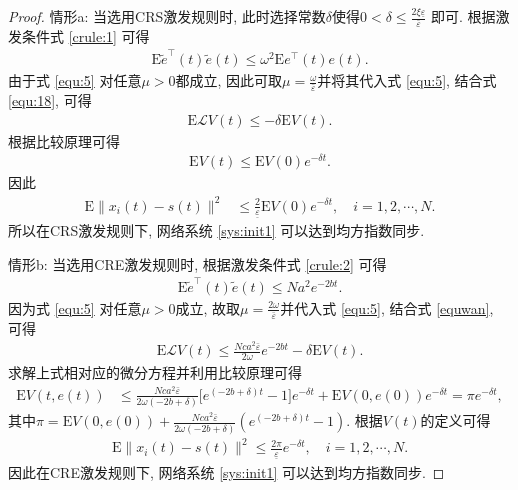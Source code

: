 \begin{proof}
            情形a: 当选用CRS激发规则时, 此时选择常数$\delta$使得$0<\delta\leq\frac{2\xi\underline{\varepsilon}}{\bar{\varepsilon}}$ 即可. 根据激发条件式 \eqref{crule:1} 可得
            \begin{align}\label{equ:18}
                \mathrm{E}\tilde{e}^{\top}(t)\tilde{e}(t)\leq\omega^2\mathrm{E}e^\top(t)e(t).
            \end{align}
            由于式 \eqref{equ:5} 对任意$\mu>0$都成立, 因此可取$\mu=\frac{\omega}{\bar{\varepsilon}}$并将其代入式 \eqref{equ:5}, 结合式 \eqref{equ:18}, 可得
            \begin{align*}
                \mathrm{E}\mathcal{L}V(t)\leq -\delta \mathrm{E}V(t).
            \end{align*}
            根据比较原理可得
            \begin{align*}
            \mathrm{E}V(t)\leq \mathrm{E}V(0)e^{-\delta t}.
            \end{align*}
            因此
            \begin{align*}
             \mathrm{E}\| x_{i}(t)-s(t)\|^2&\leq\frac{2}{\underline{\varepsilon}}\mathrm{E}V(0)e^{-\delta t},\quad i=1,2,\cdots,N.
            \end{align*}
            所以在CRS激发规则下, 网络系统 \eqref{sys:init1} 可以达到均方指数同步.

        情形b: 当选用CRE激发规则时, 根据激发条件式 \eqref{crule:2} 可得
            \begin{align}\label{equwan}
                \mathrm{E}\tilde{e}^{\top}(t)\tilde{e}(t)\leq Na^2e^{-2bt}.
            \end{align}
        因为式 \eqref{equ:5} 对任意$\mu>0$成立, 故取$\mu=\frac{2\omega}{\bar{\varepsilon}}$并代入式 \eqref{equ:5}, 结合式 \eqref{equwan}, 可得
            \begin{align*}
            \mathrm{E}\mathcal{L}V(t)
            \leq \frac{Nca^2\bar{\varepsilon}}{2\omega}e^{-2bt} -\delta \mathrm{E}V(t).
            \end{align*}
        求解上式相对应的微分方程并利用比较原理可得
            \begin{align*}
            \mathrm{E}V(t,e(t))&\leq\frac{Nca^2\bar{\varepsilon}}{2\omega(-2b+\delta)}\Big[e^{(-2b+\delta)t}-1\Big]e^{-\delta t}+ \mathrm{E}V(0,e(0))e^{-\delta t}
            =\pi e^{-\delta t},
            \end{align*}
        其中$\pi=\mathrm{E}V(0,e(0))+\frac{Nca^2\bar{\varepsilon}}{2\omega(-2b+\delta)}(e^{(-2b+\delta)t}-1)$. 根据$V(t)$的定义可得
             \begin{align*}
             \mathrm{E}\| x_{i}(t)-s(t)\|^2\leq\frac{2\pi}{\underline{\varepsilon}}e^{-\delta t},\quad i=1,2,\cdots,N.
            \end{align*}
           因此在CRE激发规则下, 网络系统 \eqref{sys:init1} 可以达到均方指数同步.
        \end{proof}
